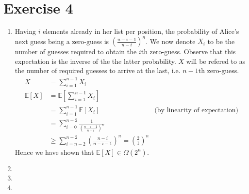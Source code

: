 \documentclass[a4paper,german]{article}
\begin{document}
\section*{Exercise 4}
\begin{enumerate}
\item
Having \(i\) elements already in her list per position, the probability of Alice's next guess being a zero-guess is \((\frac{n-i-1}{n-i})^n\). We now denote \(X_i \) to be the number of guesses required to obtain the \(i\)th zero-guess. Observe that this expectation is the inverse of the the latter probability. \(X\) will be refered to as the number of required guesses to arrive at the last, i.e. \(n-1\)th zero-guess.
\begin{align*}
X &= \sum_{i=1}^{n-1} X_i \\
\mathbb{E}[X] &= \mathbb{E}[\sum_{i=1}^{n-1} X_i ]\\
&= \sum_{i=1}^{n-1} \mathbb{E}[X_i] & \text{(by linearity of expectation)} \\
&= \sum_{i=0}^{n-2}\frac{1}{ (\frac{n-i-1}{n-i})^n}\\
&\geq \sum_{i=n-2}^{n-2} (\frac{n-i}{n-i-1})^n = (\frac{2}{1})^n
\end{align*}
Hence we have shown that \( \mathbb{E}[X] \in \Omega(2^n) \).
\item
\item
\item
\end{enumerate}
\end{document}
